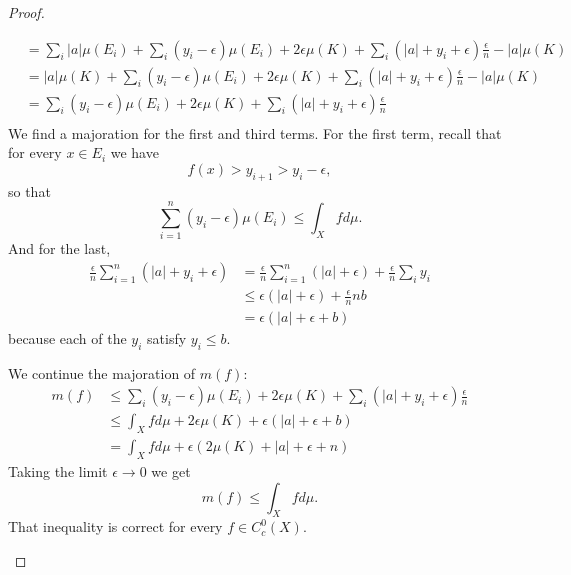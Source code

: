 \begin{proof}
\begin{subproof}
\begin{subequations}
\begin{align}
				     & =\sum_i| a |\mu(E_i)+\sum_i(y_i-\epsilon)\mu(E_i)+2\epsilon\mu(K)+\sum_i(| a |+y_i+\epsilon)\frac{ \epsilon }{ n }-| a |\mu(K) \\
				     & =| a |\mu(K)+\sum_i(y_i-\epsilon)\mu(E_i)+2\epsilon\mu(K)+\sum_i(| a |+y_i+\epsilon)\frac{ \epsilon }{ n }-| a |\mu(K)         \\
				     & =\sum_i(y_i-\epsilon)\mu(E_i)+2\epsilon\mu(K)+\sum_i(| a |+y_i+\epsilon)\frac{ \epsilon }{ n }                                 \\
			\end{align}
		\end{subequations}
		We find a majoration for the first and third terms. For the first term, recall that for every \( x\in E_i\) we have
		\begin{equation}
			f(x)>y_{i+1}>y_i-\epsilon,
		\end{equation}
		so that
		\begin{equation}
			\sum_{i=1}^n(y_i-\epsilon)\mu(E_i)\leq \int_Xfd\mu.
		\end{equation}
		And for the last,
		\begin{subequations}
			\begin{align}
				\frac{ \epsilon }{ n }\sum_{i=1}^n(| a |+y_i+\epsilon) & =\frac{ \epsilon }{ n }\sum_{i=1}^n(| a |+\epsilon)+\frac{ \epsilon }{ n }\sum_iy_i \\
				                                                       & \leq \epsilon(| a |+\epsilon)+\frac{ \epsilon }{ n }nb                              \\
				                                                       & =\epsilon(| a |+\epsilon+b)
			\end{align}
		\end{subequations}
		because each of the \( y_i\) satisfy \( y_i\leq b\).

		We continue the majoration of \( m(f)\):
		\begin{subequations}
			\begin{align}
				m(f) & \leq \sum_i(y_i-\epsilon)\mu(E_i)+2\epsilon\mu(K)+\sum_i(| a |+y_i+\epsilon)\frac{ \epsilon }{ n } \\
				     & \leq\int_Xfd\mu+2\epsilon\mu(K)+\epsilon(| a |+\epsilon+b)                                         \\
				     & =\int_Xfd\mu+\epsilon(2\mu(K)+| a |+\epsilon+n)
			\end{align}
		\end{subequations}
		Taking the limit \( \epsilon\to 0\) we get
		\begin{equation}
			m(f)\leq \int_Xfd\mu.
		\end{equation}
		That inequality is correct for every \( f\in C^0_c(X)\).


\end{subproof}
\end{proof}

